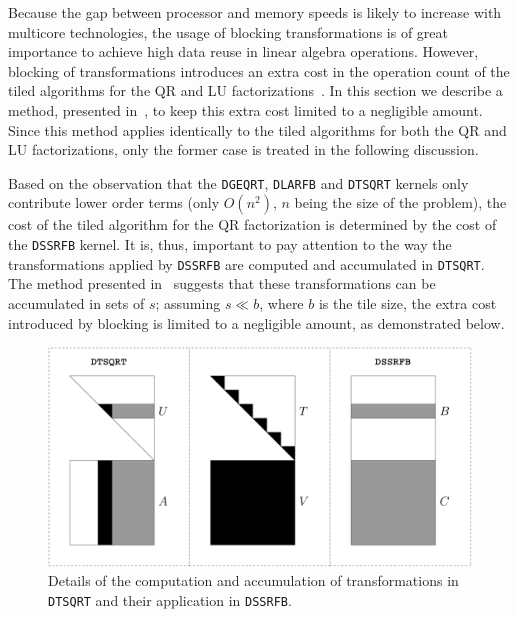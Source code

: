 \documentclass{article}
\begin{document}
Because the gap between processor and memory speeds is likely to
increase with multicore technologies, the usage of blocking
transformations is of great importance to achieve high data reuse in
linear algebra operations. However, blocking of transformations
introduces an extra cost in the operation count of the tiled
algorithms for the QR and LU
factorizations~\cite{DBLP:conf/para/JoffrainQG04,vdgooclu,1055534,tiledqr,vdgqr}. In this section
we describe a method, presented in~\cite{DBLP:conf/para/JoffrainQG04,vdgooclu,1055534,vdgqr}, to
keep this extra cost limited to a negligible amount. Since this method
applies identically to the tiled algorithms for both the QR and LU
factorizations, only the former case is treated in the following
discussion.

Based on the observation that the \texttt{DGEQRT}, \texttt{DLARFB} and
\texttt{DTSQRT} kernels only contribute lower order terms (only
$O(n^2)$, $n$ being the size of the problem), the cost of
the tiled algorithm for the QR factorization is determined by the cost
of the \texttt{DSSRFB} kernel. It is, thus, important to pay attention
to the way the transformations applied by \texttt{DSSRFB} are computed
and accumulated in \texttt{DTSQRT}. The method presented
in~\cite{DBLP:conf/para/JoffrainQG04,vdgooclu,1055534,tiledqr,vdgqr} suggests that these
transformations can be accumulated in sets of $s$; assuming $s \ll b$,
where $b$ is the tile size, the extra cost introduced by blocking is
limited to a negligible amount, as demonstrated below.
\begin{figure}[!h]
  \begin{center}
    \includegraphics[width=\textwidth]{images/inner_blk}
  \caption{\label{fig:inner_blk}Details of the computation and
    accumulation of transformations in \texttt{DTSQRT} and their
    application in \texttt{DSSRFB}.}
  \end{center}
\end{figure}
\end{document}
